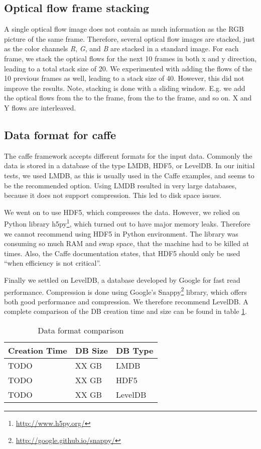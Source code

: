 
\subsection{Optical flow frame stacking}
A single optical flow image does not contain as much information as the RGB picture of the same frame.
Therefore, several optical flow images are stacked, just as the color channels \emph{R}, \emph{G}, and \emph{B} are stacked in a standard image.
For each frame, we stack the optical flows for the next 10 frames in both x and y direction, leading to a total stack size of 20.
We experimented with adding the flows of the 10 previous frames as well, leading to a stack size of 40.
However, this did not improve the results.
Note, stacking is done with a sliding window. E.g. we add the optical flows from the  to the  frame, from the  to the  frame, and so on. X and Y flows are interleaved.


\subsection{Data format for caffe}
The caffe framework accepts different formats for the input data. Commonly the data is stored in a database of the type LMDB, HDF5, or LevelDB.
In our initial tests, we used LMDB, as this is usually used in the Caffe examples, and seems to be the recommended option.
Using LMDB resulted in very large databases, because it does not support compression.
This led to disk space issues.

We went on to use HDF5, which compresses the data.
However, we relied on Python library h5py\footnote{\url{http://www.h5py.org/}}, which turned out to have major memory leaks. Therefore we cannot recommend using HDF5 in Python environment.
The library was consuming so much RAM and swap space, that the machine had to be killed at times.
Also, the Caffe documentation states, that HDF5 should only be used ``when efficiency is not critical''.

Finally we settled on LevelDB, a database developed by Google for fast read performance.
Compression is done using Google's Snappy\footnote{\url{http://google.github.io/snappy/}} library, which offers both good performance and compression.
We therefore recommend LevelDB. A complete comparison of the DB creation time and size can be found in table \ref{table:databases}.

\begin{table}[]
\centering
\caption{Data format comparison}
\label{table:databases}
\begin{tabular}{lll}
\toprule
Creation Time 		& DB Size  & DB Type \\ \midrule
TODO           & XX GB  	 & LMDB \\
TODO          		& XX GB  	 & HDF5 \\
TODO          		& XX GB  	 & LevelDB \\
\bottomrule
\end{tabular}
\end{table}

